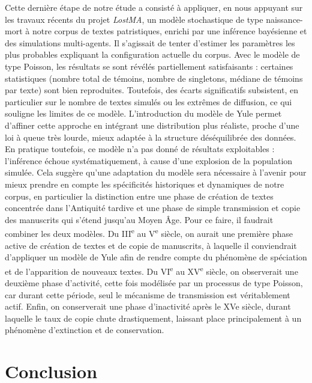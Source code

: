 \documentclass[a4paper,twoside,12pt]{book}
\begin{document}
Cette dernière étape de notre étude a consisté à appliquer, en nous appuyant sur les travaux récents du projet \textit{LostMA}, un modèle stochastique de type naissance-mort à notre corpus de textes patristiques, enrichi par une inférence bayésienne et des simulations multi-agents. Il s’agissait de tenter d’estimer les paramètres les plus probables expliquant la configuration actuelle du corpus. Avec le modèle de type Poisson, les résultats se sont révélés partiellement satisfaisants : certaines statistiques (nombre total de témoins, nombre de singletons, médiane de témoins par texte) sont bien reproduites. Toutefois, des écarts significatifs subsistent, en particulier sur le nombre de textes simulés ou les extrêmes de diffusion, ce qui souligne les limites de ce modèle. L’introduction du modèle de Yule permet d’affiner cette approche en intégrant une distribution plus réaliste, proche d'une loi à queue très lourde, mieux adaptée à la structure déséquilibrée des données. En pratique toutefois, ce modèle n’a pas donné de résultats exploitables : l’inférence échoue systématiquement, à cause d'une explosion de la population simulée. Cela suggère qu’une adaptation du modèle sera nécessaire à l’avenir pour mieux prendre en compte les spécificités historiques et dynamiques de notre corpus, en particulier la distinction entre une phase de création de textes concentrée dans l’Antiquité tardive et une phase de simple transmission et copie des manuscrits qui s’étend jusqu’au Moyen Âge. Pour ce faire, il faudrait combiner les deux modèles. Du III\textsuperscript{e} au V\textsuperscript{e} siècle, on aurait une première phase active de création de textes et de copie de manuscrits, à laquelle il conviendrait d’appliquer un modèle de Yule afin de rendre compte du phénomène de spéciation et de l’apparition de nouveaux textes. Du VI\textsuperscript{e} au XV\textsuperscript{e} siècle, on observerait une deuxième phase d’activité, cette fois modélisée par un processus de type Poisson, car durant cette période, seul le mécanisme de transmission est véritablement actif. Enfin, on conserverait une phase d’inactivité après le XVe siècle, durant laquelle le taux de copie chute drastiquement, laissant place principalement à un phénomène d’extinction et de conservation.


\chapter*{Conclusion}
\end{document}
